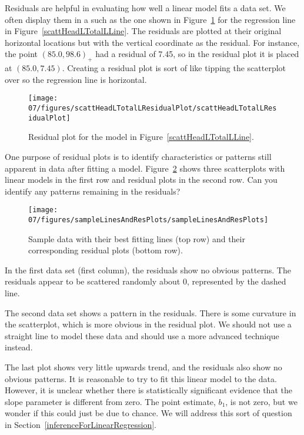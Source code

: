 Residuals are helpful in evaluating how well a linear model fits a data set. We often display them in a  such as the one shown in Figure~\ref{scattHeadLTotalLResidualPlot} for the regression line in Figure~\ref{scattHeadLTotalLLine}. The residuals are plotted at their original horizontal locations but with the vertical coordinate as the residual. For instance, the point $(85.0,98.6)_{+}$ had a residual of 7.45, so in the residual plot it is placed at $(85.0, 7.45)$. Creating a residual plot is sort of like tipping the scatterplot over so the regression line is horizontal. 
\begin{figure}
   \centering
   \texttt{[image: 07/figures/scattHeadLTotalLResidualPlot/scattHeadLTotalLResidualPlot]}
   \caption{Residual plot for the model in Figure~\ref{scattHeadLTotalLLine}.}
   \label{scattHeadLTotalLResidualPlot}
\end{figure}

\begin{example}{One purpose of residual plots is to identify characteristics or patterns still apparent in data after fitting a model. Figure~\ref{sampleLinesAndResPlots} shows three scatterplots with linear models in the first row and residual plots in the second row. Can you identify any patterns remaining in the residuals?}
\begin{figure}
   \centering
   \texttt{[image: 07/figures/sampleLinesAndResPlots/sampleLinesAndResPlots]}
   \caption{Sample data with their best fitting lines (top row) and their corresponding residual plots (bottom row).}
   \label{sampleLinesAndResPlots}
\end{figure}
In the first data set (first column), the residuals show no obvious patterns. The residuals appear to be scattered randomly about 0, represented by the dashed line.

The second data set shows a pattern in the residuals. There is some curvature in the scatterplot, which is more obvious in the residual plot. We should not use a straight line to model these data and should use a more advanced technique instead.

The last plot shows very little upwards trend, and the residuals also show no obvious patterns. It is reasonable to try to fit this linear model to the data. However, it is unclear whether there is statistically significant evidence that the slope parameter is different from zero. The point estimate, $b_1$, is not zero, but we wonder if this could just be due to chance. We will address this sort of question in Section~\ref{inferenceForLinearRegression}.
\end{example}


